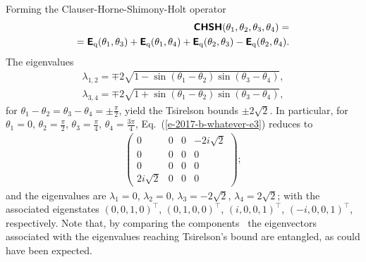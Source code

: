 \documentclass[%
  twocolumn,
 showpacs,
 showkeys,
 preprintnumbers,
 amsmath,amssymb,
 aps,
  pra,
  longbibliography,
 floatfix,
 ]{revtex4-1}
\begin{document}
Forming the Clauser-Horne-Shimony-Holt operator
\begin{equation}
\begin{split}
\textsf{\textbf{CHSH}}( \theta_1, \theta_2,  \theta_3, \theta_4)=\\=
\textsf{\textbf{E}}_{\text{q}} ( \theta_1, \theta_3) +
\textsf{\textbf{E}}_{\text{q}} ( \theta_1, \theta_4) +
\textsf{\textbf{E}}_{\text{q}} ( \theta_2, \theta_3 ) -
\textsf{\textbf{E}}_{\text{q}} ( \theta_2, \theta_4)
.
\end{split}
\label{e-2017-b-whatever-e3}
\end{equation}
The eigenvalues
\begin{equation}
\begin{split}
\lambda_{1,2} = \mp 2 \sqrt{1 - \sin (\theta_1-\theta_2) \sin (\theta_3-\theta_4)},     \\
\lambda_{3,4} = \mp 2 \sqrt{1 + \sin (\theta_1-\theta_2) \sin (\theta_3-\theta_4)}
,
\end{split}
\label{e-2017-b-whatever-e4}
\end{equation}
for $\theta_1-\theta_2= \theta_3-\theta_4 =\pm \frac{\pi}{2}$, yield  the Tsirelson bounds $\pm 2\sqrt{2}$.
In particular, for
$\theta_1=0$,
$\theta_2= \frac{\pi}{2}$,
$\theta_3=\frac{\pi}{4}$,
$\theta_4 = \frac{3\pi}{4}$,
Eq.~(\ref{e-2017-b-whatever-e3})
reduces to
\begin{equation}
\begin{split}
\begin{pmatrix}
0 & 0 & 0 & -2 i \sqrt{2} \\
 0 & 0 & 0 & 0 \\
 0 & 0 & 0 & 0 \\
 2 i \sqrt{2} & 0 & 0 & 0
\end{pmatrix}  ;
\end{split}
\label{e-2017-b-whatever-e5}
\end{equation}
and the eigenvalues are
$\lambda_1 =0$,
$\lambda_2 = 0$,
$\lambda_3 = -2 \sqrt{2}$,
$\lambda_4 = 2 \sqrt{2}$;
with the associated eigenstates
$\left( 0, 0, 1, 0\right)^\intercal$,
$\left( 0, 1, 0, 0\right)^\intercal$,
$\left( i, 0, 0, 1\right)^\intercal$,
$\left( -i, 0, 0, 1\right)^\intercal$,
respectively.
Note that, by comparing the components~\cite[p.~18]{mermin-07} the eigenvectors associated with the eigenvalues reaching Tsirelson's bound are entangled,
as could have been expected.
\end{document}
